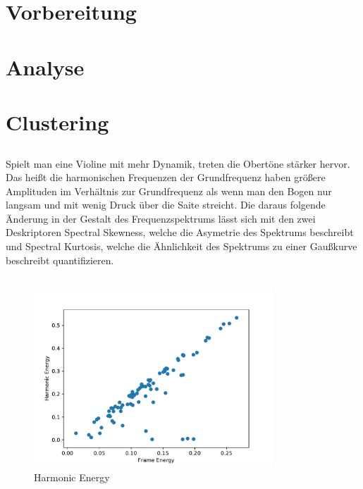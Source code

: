 \section{Vorbereitung}
\label{sec:preperation}





\section{Analyse}
\label{sec:analyse}




\section{Clustering}
\label{sec:cluster}
\subsection{}
\subsection{}
Spielt man eine Violine mit mehr Dynamik, treten die Obertöne stärker hervor.
Das heißt die harmonischen Frequenzen der Grundfrequenz haben größere Amplituden im Verhältnis zur Grundfrequenz als wenn man den Bogen nur langsam und mit wenig Druck über die Saite streicht.  
Die daraus folgende Änderung in der Gestalt des Frequenzspektrums lässt sich mit den zwei Deskriptoren Spectral Skewness, welche die Asymetrie des Spektrums beschreibt und Spectral Kurtosis, welche die Ähnlichkeit des Spektrums zu einer Gaußkurve beschreibt quantifizieren. 

\subsection{}


\subsection{}

\begin{figure}[H]
    \center
    \includegraphics[width = 0.8\textwidth]{Figures/harmonicErg}
    \caption{Harmonic Energy}
    \label{fig:im}
\end{figure}


